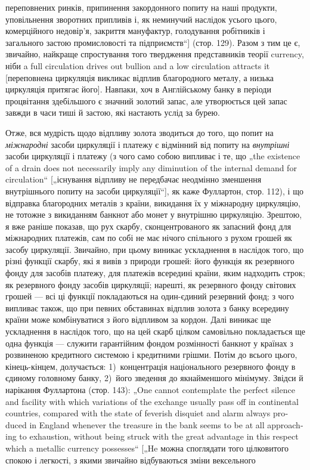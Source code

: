 \parcont{}  %
переповнених ринків, припинення закордонного попиту на наші
продукти, уповільнення зворотних припливів і, як неминучий
наслідок усього цього, комерційного недовір’я, закриття мануфактур,
голодування робітників і загального застою промисловості
та підприємств“] (стор. 129). Разом з тим це є, звичайно,
найкраще спростування того твердження представників теорії
currency, ніби a full circulation drives out bullion and a low circulation
attracts it [переповнена циркуляція викликає відплив благородного
металу, а низька циркуляція притягає його]. Навпаки,
хоч в Англійському банку в періоди процвітання здебільшого є
значний золотий запас, але утворюється цей запас завжди в часи
тиші й застою, які настають услід за бурею.

Отже, вся мудрість щодо відпливу золота зводиться до того,
що попит на \emph{міжнародні} засоби циркуляції і платежу є відмінний
від попиту на \emph{внутрішні} засоби циркуляції і платежу (з чого
само собою випливає і те, що „the existence of a drain does not
necessarily imply any diminution of the internal demand for circulation“
[„існування відпливу не передбачає неодмінно зменшення
внутрішнього попиту на засоби циркуляції“], як каже Фуллартон,
стор. 112), і що відправка благородних металів з країни,
викидання їх у міжнародну циркуляцію, не тотожне з викиданням
банкнот або монет у внутрішню циркуляцію. Зрештою,
я вже раніше показав, що рух скарбу, сконцентрованого як запасний
фонд для міжнародних платежів, сам по собі не має
нічого спільного з рухом грошей як засобу циркуляції. Звичайно,
при цьому виникає ускладнення в наслідок того, що різні функції
скарбу, які я вивів з природи грошей: його функція як резервного
фонду для засобів платежу, для платежів всередині
країни, яким надходить строк; як резервного фонду засобів циркуляції;
нарешті, як резервного фонду світових грошей — всі ці
функції покладаються на один-єдиний резервний фонд; з чого випливає
також, що при певних обставинах відплив золота з банку
всередину країни може комбінуватися з його відпливом за кордон.
Далі виникає ще ускладнення в наслідок того, що на цей скарб
цілком самовільно покладається ще одна функція — служити гарантійним
фондом розмінності банкнот у країнах з розвиненою
кредитного системою і кредитними грішми. Потім до всього
цього, кінець-кінцем, долучається: 1)~концентрація національного
резервного фонду в єдиному головному банку, 2)~його зведення
до якнайменшого мінімуму. Звідси й нарікання Фуллартона
(стор. 143): „\textenglish{One cannot contemplate the perfect silence and facility
with which variations of the exchange usually pass off in continental
countries, compared with the state of feverish disquiet and
alarm always produced in England whenever the treasure in the
bank seems to be at all approaching to exhaustion, without being
struck with the great advantage in this respect which a metallic currency
possesses}“ [„He можна споглядати того цілковитого спокою
і легкості, з якими звичайно відбуваються зміни вексельного
\parbreak{}  %
